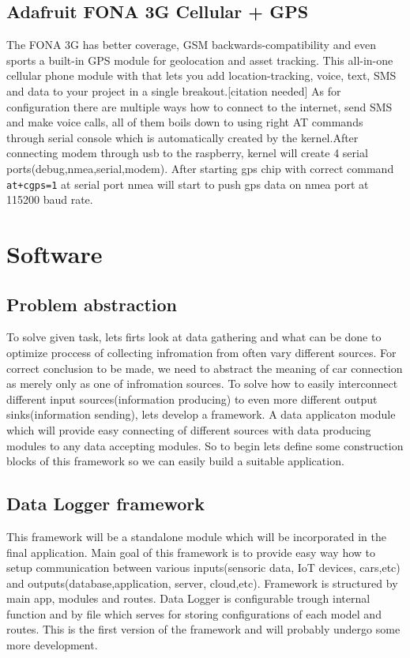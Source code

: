 \subsection{Adafruit FONA 3G Cellular + GPS} %
\label{sub:adafruit_fona_3g_cellular_gps_}
The FONA 3G has better coverage, GSM backwards-compatibility and even sports a built-in GPS module for geolocation and asset tracking. This all-in-one cellular phone module with that lets you add location-tracking, voice, text, SMS and data to your project in a single breakout.[citation needed] As for configuration there are multiple ways how to connect to the internet, send SMS and make voice calls, all of them boils down to using right AT commands through serial console which is automatically created by the kernel.After connecting modem through usb to the raspberry, kernel will create 4 serial ports(debug,nmea,serial,modem). After starting gps chip with correct command \verb|at+cgps=1| at serial port nmea will start to push gps data on nmea port at 115200 baud rate.
\newpage
\section{Software} %
\label{sec:software}
\subsection{Problem abstraction} %
\label{sub:problem_abstraction}
To solve given task, lets firts look at data gathering and what can be done to optimize proccess of collecting infromation from often vary different sources. For correct conclusion to be made, we need to abstract the meaning of car connection as merely only as one of infromation sources. To solve how to easily interconnect different input sources(information producing) to even more different output sinks(information sending), lets develop a framework. A data applicaton module which will provide easy connecting of different sources with data producing modules to any data accepting modules. So to begin lets define some construction blocks of this framework so we can easily build a suitable application.
\subsection{Data Logger framework} %
This framework will be a standalone module which will be incorporated in the final application. Main goal of this framework is to provide easy way how to setup communication between various inputs(sensoric data, IoT devices, cars,etc) and outputs(database,application, server, cloud,etc). Framework is structured by main app, modules and routes. Data Logger is configurable trough internal function and by file which serves for storing configurations of each model and routes. This is the first version of the framework and will probably undergo some more development.
